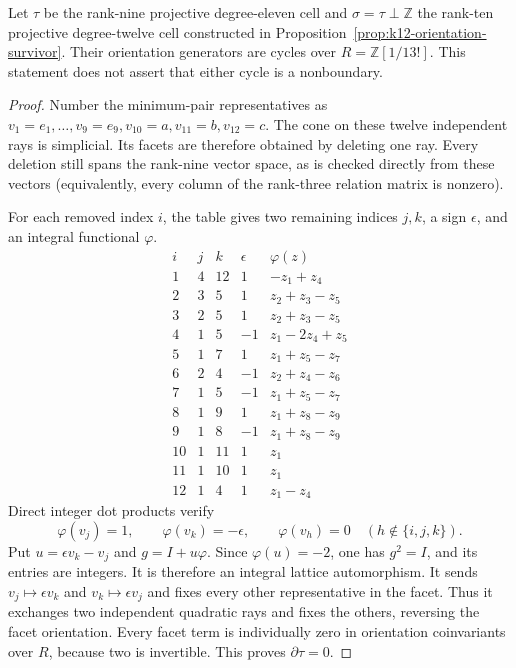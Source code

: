 \begin{proposition}
\label{prop:k12-survivor-cycle}
Let $\tau$ be the rank-nine projective degree-eleven cell and
$\sigma=\tau\perp\mathbb Z$ the rank-ten projective degree-twelve
cell constructed in Proposition~\ref{prop:k12-orientation-survivor}.
Their orientation generators are cycles over $R=\mathbb Z[1/13!]$.
This statement does not assert that either cycle is a nonboundary.
\end{proposition}

\begin{proof}
Number the minimum-pair representatives as
$v_1=e_1,\ldots,v_9=e_9,v_{10}=a,v_{11}=b,v_{12}=c$.
The cone on these twelve independent rays is simplicial. Its facets
are therefore obtained by deleting one ray. Every deletion still
spans the rank-nine vector space, as is checked directly from these
vectors (equivalently, every column of the rank-three relation
matrix is nonzero).

For each removed index $i$, the table gives two remaining indices
$j,k$, a sign $\epsilon$, and an integral functional $\varphi$.
\[
\begin{array}{c|cc|r|l}
i&j&k&\epsilon&\varphi(z)\\\hline
1&4&12&1&-z_1+z_4\\
2&3&5&1&z_2+z_3-z_5\\
3&2&5&1&z_2+z_3-z_5\\
4&1&5&-1&z_1-2z_4+z_5\\
5&1&7&1&z_1+z_5-z_7\\
6&2&4&-1&z_2+z_4-z_6\\
7&1&5&-1&z_1+z_5-z_7\\
8&1&9&1&z_1+z_8-z_9\\
9&1&8&-1&z_1+z_8-z_9\\
10&1&11&1&z_1\\
11&1&10&1&z_1\\
12&1&4&1&z_1-z_4
\end{array}
\]
Direct integer dot products verify
\[
\varphi(v_j)=1,\qquad \varphi(v_k)=-\epsilon,\qquad
\varphi(v_h)=0\quad(h\notin\{i,j,k\}).
\]
Put $u=\epsilon v_k-v_j$ and $g=I+u\varphi$.
Since $\varphi(u)=-2$, one has $g^2=I$, and its entries are integers.
It is therefore an integral lattice automorphism. It sends
$v_j\mapsto\epsilon v_k$ and $v_k\mapsto\epsilon v_j$ and fixes every
other representative in the facet. Thus it exchanges two independent
quadratic rays and fixes the others, reversing the facet orientation.
Every facet term is individually zero in orientation coinvariants
over $R$, because two is invertible. This proves $\partial\tau=0$.


\end{proof}
